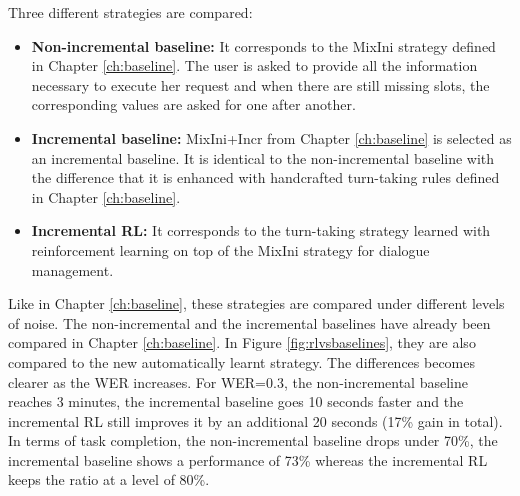     	Three different strategies are compared:
        \begin{itemize}
        	\item \textbf{Non-incremental baseline:} It corresponds to the MixIni strategy defined in Chapter \ref{ch:baseline}. The user is asked to provide all the information necessary to execute her request and when there are still missing slots, the corresponding values are asked for one after another.
            \item \textbf{Incremental baseline:} MixIni+Incr from Chapter \ref{ch:baseline} is selected as an incremental baseline. It is identical to the non-incremental baseline with the difference that it is enhanced with handcrafted turn-taking rules defined in Chapter \ref{ch:baseline}.
            \item \textbf{Incremental RL:} It corresponds to the turn-taking strategy learned with reinforcement learning on top of the MixIni strategy for dialogue management.
        \end{itemize}
        
        Like in Chapter \ref{ch:baseline}, these strategies are compared under different levels of noise. The non-incremental and the incremental baselines have already been compared in Chapter \ref{ch:baseline}. In Figure \ref{fig:rlvsbaselines}, they are also compared to the new automatically learnt strategy. The differences becomes clearer as the WER increases. For WER=0.3, the non-incremental baseline reaches 3 minutes, the incremental baseline goes 10 seconds faster and the incremental RL still improves it by an additional 20 seconds (17\% gain in total). In terms of task completion, the non-incremental baseline drops under 70\%, the incremental baseline shows a performance of 73\% whereas the incremental RL keeps the ratio at a level of 80\%.
